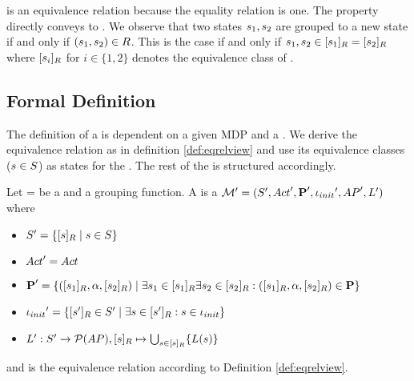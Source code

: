 \documentclass[preview]{standalone}
\begin{document}
\eqrelview is an equivalence relation because the equality relation is one. The property directly conveys to \eqrelview. We observe that two states ${s}_1, {s}_2$ are grouped to a new state if and only if $({s}_1, {s}_2) \in {R}$. This is the case if and only if ${s}_1, {s}_2 \in {\ensuremath{{[{s}_1]_{{R}}}}} = {{[{s}_2]_{{R}}}}$ where ${{[{s}_i]_{{R}}}}$ for $i \in \{1,2\}$ denotes the equivalence class of \eqrelview.

\subsection{Formal Definition}

The definition of a \viewN is dependent on a given MDP and a \grpfctN \grpfct. We derive the equivalence relation \eqrelview as in definition \ref{def:eqrelview} and use its equivalence classes  (${s} \in {S}$) as states for the \viewN. The rest of the \chosengraphtypeN is structured accordingly.


\begin{definition}
	
	Let \chgph = \chgphtuple be a \chosengraphtypeN and \grpfct a grouping function. A \emph{\viewN} \view{\viewppty} is a \chosengraphtypeN ${{\mathcal{M}}}' = {{({S}', {Act}', {\textbf{P}}', {\iota_{init}}', {AP}', {L}')}}$  where
	
	\begin{itemize}
		\item ${S}' = \{ {[{s}]_{{R}}} \mid {s} \in {S} \}$
		
		\item ${Act}' = {Act}$
		
		\item ${{\textbf{P}}}' = \{ ({{[{s}_1]_{{R}}}}, {\alpha}, {{[{s}_2]_{{R}}}}) \mid \exists {s}_1 \in {\ensuremath{{[{s}_1]_{{R}}}}} \exists {s}_2 \in {\ensuremath{{[{s}_2]_{{R}}}}} : ({{[{s}_1]_{{R}}}}, {\alpha}, {{[{s}_2]_{{R}}}}) \in {\ensuremath{{\textbf{P}}}}\}$%
		
		\item ${{\iota_{init}}}' = \{{{[{s}']_{{R}}}} \in {S}' \mid \exists {s} \in {\ensuremath{{[{s}']_{{R}}}}} : {s} \in {\ensuremath{{\iota_{init}}}} \}$
		
		\item ${L}': {S}' \to {\mathcal{P}(\ensuremath{{AP}})}, {{[{s}]_{{R}}}}\mapsto \bigcup_{{s} \in {\ensuremath{{[{s}]_{{R}}}}}} \{{L}({s})\}$
		
	\end{itemize}
	
	and \eqrelview is the equivalence relation according to Definition \ref{def:eqrelview}.
	

	\label{def:view}	
\end{definition}
\end{document}
